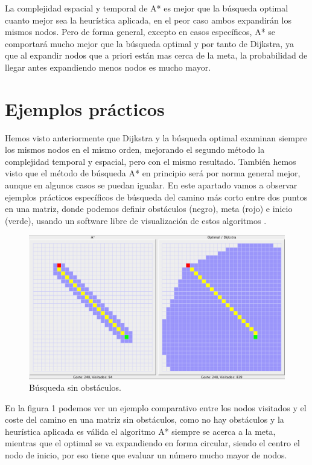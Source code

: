 \documentclass{article}
\begin{document}
La complejidad espacial y temporal de A* es mejor que la búsqueda optimal cuanto mejor sea la heurística aplicada, en el peor caso ambos expandirán los mismos nodos. Pero de forma general, excepto en casos específicos, A* se comportará mucho mejor que la búsqueda optimal y por tanto de Dijkstra, ya que al expandir nodos que a priori están mas cerca de la meta, la probabilidad de llegar antes expandiendo menos nodos es mucho mayor.

\section{Ejemplos prácticos}
Hemos visto anteriormente que Dijkstra y la búsqueda optimal examinan siempre los mismos nodos en el mismo orden, mejorando el segundo método la complejidad temporal y espacial, pero con el mismo resultado. También hemos visto que el método de búsqueda A* en principio será por norma general mejor, aunque en algunos casos se puedan igualar. En este apartado vamos a observar ejemplos prácticos específicos de búsqueda del camino más corto entre dos puntos en una matriz, donde podemos definir obstáculos (negro), meta (rojo) e inicio (verde), usando un software libre de visualización de estos algoritmos \cite{Wang}. 

\begin{figure}[h!]
    \caption{Búsqueda sin obstáculos.}
    \includegraphics[width=\textwidth]{resources/versus1}
\end{figure}

En la figura 1 podemos ver un ejemplo comparativo entre los nodos visitados y el coste del camino en una matriz sin obstáculos, como no hay obstáculos y la heurística aplicada es válida el algoritmo A* siempre se acerca a la meta, mientras que el optimal se va expandiendo en forma circular, siendo el centro el nodo de inicio, por eso tiene que evaluar un número mucho mayor de nodos.
\end{document}

